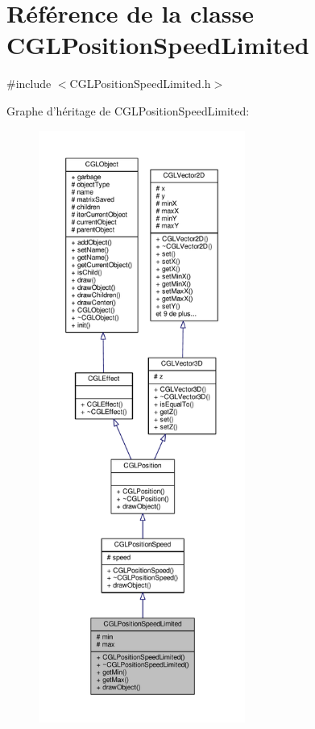 \hypertarget{class_c_g_l_position_speed_limited}{\section{Référence de la classe C\-G\-L\-Position\-Speed\-Limited}
\label{class_c_g_l_position_speed_limited}
}


{\ttfamily \#include $<$C\-G\-L\-Position\-Speed\-Limited.\-h$>$}



Graphe d'héritage de C\-G\-L\-Position\-Speed\-Limited\-:
\nopagebreak
\begin{figure}[H]
\begin{center}
\leavevmode
\includegraphics[height=550pt]{de/dad/class_c_g_l_position_speed_limited__inherit__graph}
\end{center}
\end{figure}


